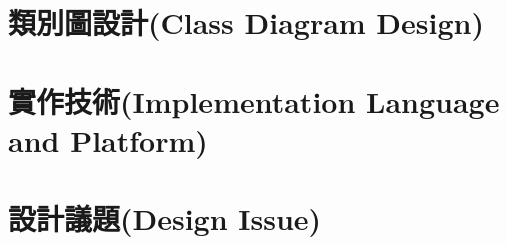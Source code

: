 \documentclass{article}
\begin{document}
\newpage

\section[類別圖設計(CLASS DIAGRAM DESIGN)]{類別圖設計(Class Diagram Design)}

\newpage

\section[實作技術(IMPLEMENTATION LANGUAGE AND PLATFORM)]{實作技術(Implementation Language and Platform)}

\newpage

\section[設計議題(DESIGN ISSUE)]{設計議題(Design Issue)}
\end{document}
